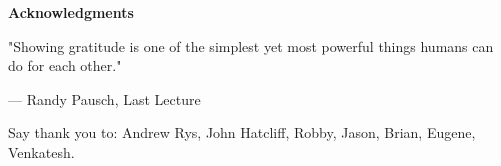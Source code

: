 
\newpage
\vspace*{0.9cm}
\begin{center}
{\bf \Huge Acknowledgments}
\end{center}

\setlength{\baselineskip}{0.8cm}


\setlength{}
\setlength\epigraphrule{0pt}
\makeatletter
{}
\makeatother

\epigraph{"Showing gratitude is one of the simplest yet most powerful things humans can do for each other."}{--- \textup{Randy Pausch}, Last Lecture}



Say thank you to: Andrew Rys, John Hatcliff, Robby, Jason, Brian, Eugene, Venkatesh.